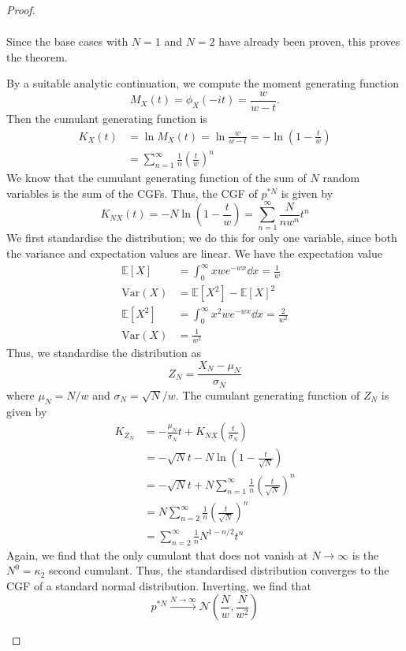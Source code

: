 \begin{proof}
\begin{parts}
\begin{align*}
		\end{align*}
		Since the base cases with $N=1$ and $N=2$ have already been proven, this proves the theorem.
	\item By a suitable analytic continuation, we compute the moment generating function
		\[
		M_X(t) = \phi_X(-it)=\frac{w}{w-t}
		.\] 
		Then the cumulant generating function is
		\begin{align*}
			K_X(t) &= \ln M_X(t) = \ln \frac{w}{w-t}=-\ln \left( 1-\frac{t}{w} \right)\\
			&= \sum_{n=1}^{\infty} \frac{1}{n}\left( \frac{t}{w} \right)^n  
	\end{align*}
We know that the cumulant generating function of the sum of $N$ random variables is the sum of the CGFs. Thus, the CGF of $p^{*N}$ is given by
\[K_{NX}(t) = -N\ln \left( 1-\frac{t}{w} \right) =\sum_{n=1}^{\infty} \frac{N}{nw^n}t^n\]
We first standardise the distribution; we do this for only one variable, since both the variance and expectation values are linear. We have the expectation value
\begin{align*}
	\mathbb{E}[X] &= \int_0^\infty xwe^{-wx}\dd{x} = \frac{1}{w} \\
	\text{Var}(X) &= \mathbb{E}[X^2]-\mathbb{E}[X]^2 \\
	\mathbb{E}[X^2] &= \int_0^\infty x^2 we^{-wx}\dd{x} = \frac{2}{w^2} \\
	\text{Var}(X) &= \frac{1}{w^2} 
\end{align*}
Thus, we standardise the distribution as
\[
Z_N = \frac{X_N - \mu_N}{\sigma_N}
\]
where $\mu_N = N / w$ and $\sigma_N = \sqrt{N} / w$. The cumulant generating function of $Z_N$ is given by
\begin{align*}
	K_{Z_N} &= - \frac{\mu_N}{\sigma_N}t + K_{NX}\left( \frac{t}{\sigma_N} \right)  \\
	&= -\sqrt{N} t- N \ln \left( 1 - \frac{t}{\sqrt{N} } \right)  \\
	&= -\sqrt{N} t + N \sum_{n=1}^{\infty} \frac{1}{n}\left( \frac{t}{\sqrt{N} } \right)^n \\
	&= N \sum_{n=2}^{\infty} \frac{1}{n}\left( \frac{t}{\sqrt{N} } \right)^n \\
	&=  \sum_{n=2}^{\infty} \frac{1}{n}N^{1 - n / 2} t^n
\end{align*}
Again, we find that the only cumulant that does not vanish at $N\to\infty$ is the $N^0=\kappa_2$ second cumulant. Thus, the standardised distribution converges to the CGF of a standard normal distribution. Inverting, we find that
\[
	p^{*N} \xrightarrow{N\to\infty} \mathcal{N}\left( \frac{N}{w}, \frac{N}{w^2} \right) 
\]
\end{parts}
\end{proof}
